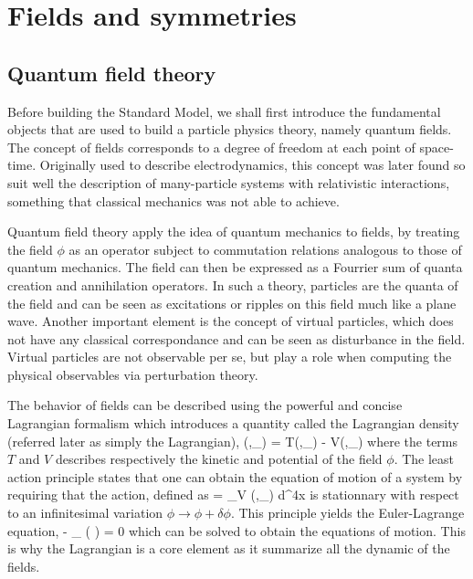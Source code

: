     \section{Fields and symmetries}

        \subsection{Quantum field theory}

    Before building the Standard Model, we shall first introduce the fundamental objects
    that are used to build a particle physics theory, namely quantum fields. The concept
    of fields corresponds to a degree of freedom at each point of space-time. Originally
    used to describe electrodynamics, this concept was later found so suit well the
    description of many-particle systems with relativistic interactions, something that
    classical mechanics was not able to achieve.

    Quantum field theory apply the idea of quantum mechanics to fields, by treating the
    field $\phi$ as an operator subject to commutation relations analogous to those of
    quantum mechanics. The field can then be expressed as a Fourrier sum of quanta
    creation and annihilation operators. In such a theory, particles are the quanta of the
    field and can be seen as excitations or ripples on this field much like a plane wave.
    Another important element is the concept of virtual particles, which does not have
    any classical correspondance and can be seen as disturbance in the field. Virtual
    particles are not observable per se, but play a role when computing the physical
    observables via perturbation theory.

    The behavior of fields can be described using the powerful and concise Lagrangian
    formalism which introduces a quantity called the Lagrangian density (referred later
    as simply the Lagrangian),
    {
        (\phi,\partial_\mu \phi)
        =
        T(\phi,\partial_\mu \phi) - V(\phi,\partial_\mu \phi)
    }
    where the terms $T$ and $V$ describes respectively the kinetic and potential of the
    field $\phi$. The least action principle states that one can obtain the equation of
    motion of a system by requiring that the action, defined as
    {
        =
        \int_V (\phi,\partial_\mu \phi) d^4x
    }
    is stationnary with respect to an infinitesimal variation $\phi \rightarrow \phi +
    \delta\phi$. This principle yields the Euler-Lagrange equation,
    {
        -
        \partial_\mu
        \left(
        \right)
        =
        0
    }
    which can be solved to obtain the equations of motion. This is why the Lagrangian is
    a core element as it summarize all the dynamic of the fields.


